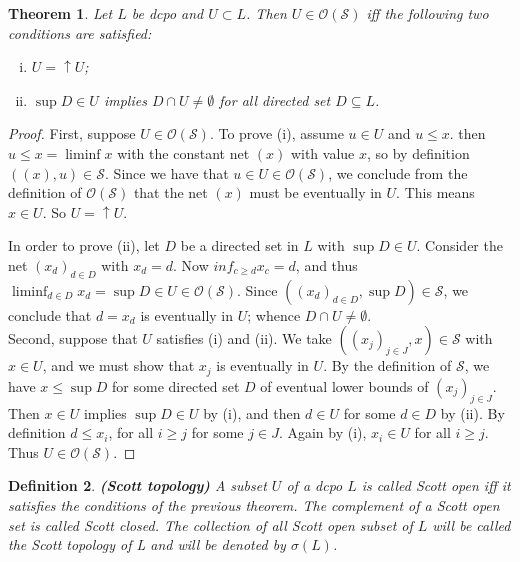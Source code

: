 \documentclass[a4paper,12pt]{article}
\newtheorem{theorem}{Theorem}[section]
\newtheorem{definition}[theorem]{Definition}
\begin{document}
\begin{theorem}\label{scottprot} Let $L$ be dcpo and $U \subset L$. Then $U \in \mathcal{O}(\mathcal{S})$ iff the following two conditions are satisfied:
\begin{enumerate}[(i)]
    \item $U = \uparrow U$;
    \item $\sup D \in U$ implies $D \cap U \neq \emptyset$ for all directed set $D \subseteq L$.
\end{enumerate}
\end{theorem}
\begin{proof}
First, suppose $U \in \mathcal{O}(\mathcal{S})$. To prove (i), assume $u \in U$ and $u \leq x$. then $u \leq x = \liminf  x$ with the constant net $(x)$ with value $x$, so by definition $((x), u) \in \mathcal{S}$. Since we have that $u \in U \in \mathcal{O}(\mathcal{S})$, we conclude from the definition of $\mathcal{O}(\mathcal{S})$ that the net $(x)$ must be eventually in $U$. This means $x \in U$. So $U = \uparrow U$.

In order to prove (ii), let $D$ be a directed set in $L$ with $\sup D \in U$. Consider the net $(x_d)_{d \in D}$ with $x_d = d$. Now $inf_{c\geq d} x_c = d$, and thus $\liminf_{d \in D} x_d = \sup D \in U \in \mathcal{O}(\mathcal{S})$. Since $((x_d)_{d \in D}, \sup D) \in \mathcal{S}$, we conclude that $d = x_d$ is eventually in $U$; whence $D \cap U \neq \emptyset$.\\

Second, suppose that $U$ satisfies (i) and (ii). We take $((x_j)_{j \in J}, x) \in \mathcal{S}$ with $x \in U$, and we must show that $x_j$ is eventually in $U$. By the definition of $\mathcal{S}$, we have $x \leq \sup D$ for some directed set $D$ of eventual lower bounds of $(x_j)_{j \in J}$. Then $x \in U$ implies $\sup D \in U$ by (i), and then $d \in U$ for some $d \in D$ by (ii). By definition $d \leq x_i$, for all $i \geq j$ for some $j \in J$. Again by (i), $x_i \in U$ for all $i \geq j$. Thus $U \in \mathcal{O}(\mathcal{S})$.
\end{proof}

\begin{definition}\textbf{(Scott topology)} A subset $U$ of a dcpo $L$ is called \emph{Scott open} iff it satisfies the conditions of the previous theorem. The complement of a Scott open set is called \emph{Scott closed}. The collection of all Scott open subset of $L$ will be called the \emph{Scott topology} of L and will be denoted by $\sigma(L)$.
\end{definition}
\end{document}
